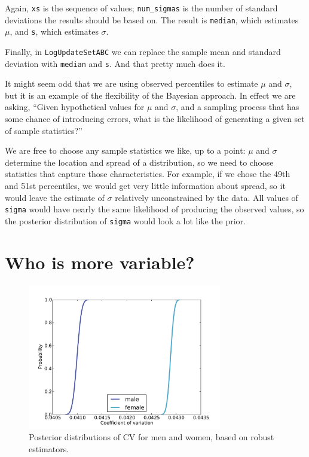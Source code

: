\documentclass[12pt]{book}
\begin{document}
Again, {\tt xs} is the sequence of values; \verb"num_sigmas" is the
number of standard deviations the results should be based on.  The
result is {\tt median}, which estimates $\mu$, and {\tt s}, which 
estimates $\sigma$.

Finally, in {\tt LogUpdateSetABC} we can replace the sample mean and
standard deviation with {\tt median} and {\tt s}.  And that pretty
much does it.

It might seem odd that we are using observed percentiles to
estimate $\mu$ and $\sigma$, but it is an example of the
flexibility of the Bayesian approach.  In effect we are asking,
``Given hypothetical values for $\mu$ and $\sigma$, and
a sampling process that has some chance of introducing errors,
what is the likelihood of generating a given set of sample
statistics?''

We are free to choose any sample statistics we like, up to a point:
$\mu$ and $\sigma$ determine the location and spread of
a distribution, so we need to choose statistics that capture those
characteristics.  For example, if we chose the 49th and 51st percentiles,
we would get very little information about spread, so it
would leave the estimate of $\sigma$ relatively unconstrained
by the data.  All values of {\tt sigma} would have nearly the
same likelihood of producing the observed values, so the posterior
distribution of {\tt sigma} would look a lot like the
prior.


\section{Who is more variable?}

\begin{figure}
\centerline{\includegraphics[height=2.5in]{figs/variability_cv.pdf}}
\caption{Posterior distributions of CV for men and women, based on
robust estimators.}
\label{fig.variability3}
\end{figure}
\end{document}
